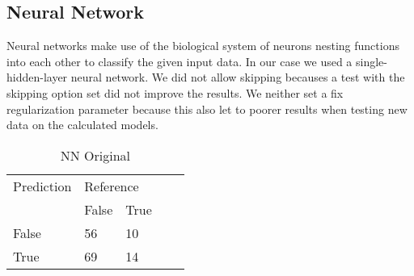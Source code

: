 \subsection{Neural Network}


Neural networks make use of the biological system of neurons nesting functions into each other to classify the given input data. In our case we used a single-hidden-layer neural network. We did not allow skipping becauses a test with the skipping option set did not improve the results. We neither set a fix regularization parameter because this also let to poorer results when testing new data on the calculated models.

\begin{table}[!htbp]
\centering
\caption{NN Original}
\vspace{0.1cm}
\label{nn-orig}
\begin{tabular}{|l|ll|ll}
\cline{1-3}
Prediction & \multicolumn{2}{l|}{Reference} &  &  \\
           & False          & True          &  &  \\ \cline{2-3}
False      & 56              & 10             &  &  \\
True       & 69              & 14             &  &  \\ \cline{1-3}
\end{tabular}
\end{table}

